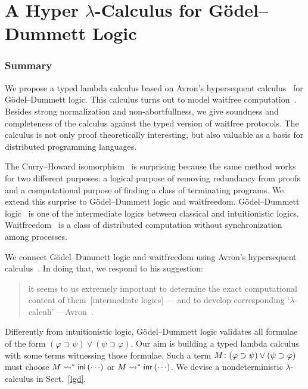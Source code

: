 \renewcommand{\comodL}{\comod cd}
\renewcommand{\comodR}{\comod dc}

\chapter{A Hyper $\lambda$-Calculus for G\"odel--Dummett Logic}
\label{ch:lambda}

\subsection{Summary}

We propose a typed lambda calculus based on Avron's hypersequent
calculus~\citep{avron91} for G\"odel--Dummett logic.  This calculus
turns out to model
waitfree computation~\citep{Herlihy88,Saks:1993vq}.
Besides strong normalization and non-abortfullness,
we give soundness and completeness of
the calculus against the typed version of waitfree protocols.
The calculus is not only proof theoretically interesting,
but also valuable as a basis for distributed programming languages.

The Curry--Howard isomorphism~\cite{curryhoward} is surprising because the same
method works for two different purposes: a logical purpose of
removing redundancy from proofs and a computational purpose of finding a
class of terminating programs.
We extend
this surprise to G\"odel--Dummett logic and
waitfreedom.
G\"odel--Dummett logic~\cite{dummett59}
is one of the intermediate logics
between classical and intuitionistic logics.
Waitfreedom~\cite{Herlihy88,Saks:1993vq} is a class of distributed
computation without synchronization among processes.

We connect G\"odel--Dummett logic and waitfreedom using
Avron's hypersequent calculus~\cite{avron91}.
In doing that, we respond to his suggestion:
\begin{quote}
it seems to us extremely important to determine the exact
       computational content of them~[intermediate logics] ---
       and {to develop corresponding `$\lambda$-calculi'}
       ---Avron~\cite{avron91}.
\end{quote}
Differently from intuitionistic logic, G\"odel--Dummett logic validates
all formulae of the form
 $(\varphi\supset\psi)\vee(\psi\supset\varphi)$.
Our aim is building a typed lambda calculus
with some terms witnessing those formulae.
Such a term
${M} \colon{(\varphi\supset\psi)\vee(\psi\supset\varphi)}$ must choose
$M\rightsquigarrow^\ast \mathsf{inl}\left({\cdots}\right)$ or $M\rightsquigarrow^\ast \mathsf{inr}\left({\cdots}\right)$.
We devise a nondeterministic $\lambda$-calculus in Sect.~\ref{lgd}.

